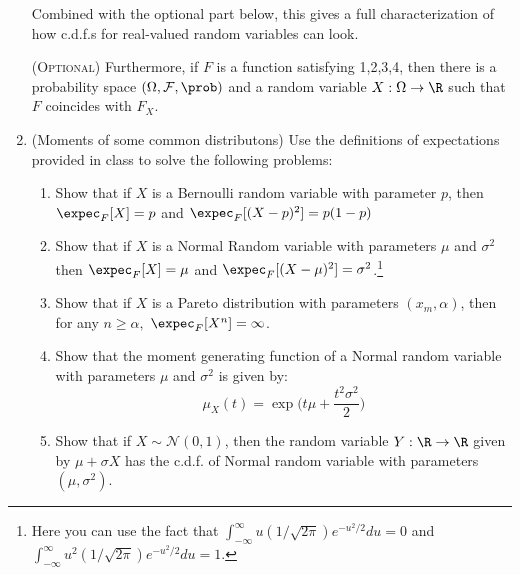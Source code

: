 \documentclass[11pt]{article} %
\begin{document}
\begin{enumerate}
 Combined with the optional part below, this gives a full characterization of how c.d.f.s for real-valued random variables can look.

\noindent ({\scshape Optional}) Furthermore, if $F$ is a function satisfying 1,2,3,4, then there is a probability space $(\Omega, \mathcal{F}, \prob)$ and a random variable $X: \Omega \rightarrow \R$ such that $F$ coincides with $F_{X}$. 

\item (Moments of some common distributons) Use the definitions of expectations provided in class to solve the following problems:
\begin{enumerate}
\item Show that if $X$ is a Bernoulli random variable with parameter $p$, then $\expec_{F}[X]=p$ and $\expec_{F}[(X-p)^2]=p(1-p)$
\item Show that if $X$ is a Normal Random variable with parameters $\mu$ and $\sigma^2$ then $\expec_{F}[X]=\mu$ and $\expec_{F}[(X-\mu)^2]=\sigma^2$.\footnote{Here you can use the fact that $\int_{-\infty}^{\infty} u (1/\sqrt{2 \pi}) e^{-u^2/2} du =0$ and $\int_{-\infty}^{\infty} u^2 (1/\sqrt{2 \pi}) e^{-u^2/2} du =1$.} 
\item Show that if $X$ is a Pareto distribution with parameters $(x_m, \alpha)$, then for any $n \geq \alpha,$ $\expec_{F}[X^{n}]=\infty$. 
\item Show that the moment generating function of a Normal random variable with parameters $\mu$ and $\sigma^2$ is given by:
$$\mu_{X}(t)= \exp \Big( t \mu + \frac{t^2 \sigma^2}{2}  \Big)  $$

\item Show that if $X \sim \mathcal{N}(0,1)$, then the random variable $Y:\R \rightarrow \R$ given by $\mu + \sigma X$ has the c.d.f. of Normal random variable with parameters $(\mu, \sigma^2)$. 

\end{enumerate}


\end{enumerate}

\newpage

%
%
\end{document}
